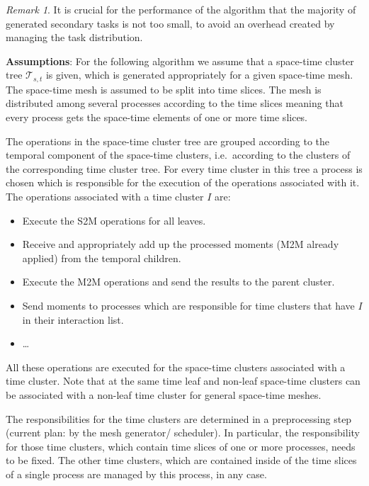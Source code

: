\documentclass[a4paper,11pt]{article}
\theoremstyle{plain}
\theoremstyle{definition}
\theoremstyle{remark}
\newtheorem{remark}[thm]{Remark}
\begin{document}
\begin{remark}
  It is crucial for the performance of the algorithm that the majority of generated secondary tasks is not too small, 
  to avoid an overhead created by managing the task distribution. 
\end{remark}

\textbf{Assumptions}: For the following algorithm we assume that a space-time cluster tree $\mathcal{T}_{s,t}$ is 
given, which is generated appropriately for a given space-time mesh. The space-time mesh is assumed to be split into 
time slices. The mesh is distributed among several processes according to the time slices meaning that every process 
gets the space-time elements of one or more time slices. 

The operations in the space-time cluster tree are grouped according to the temporal component of the space-time
clusters, i.e.~according to the clusters of the corresponding time cluster tree. For every time cluster in this tree a
process is chosen which is responsible for the execution of the operations associated with it. The operations associated
with a time cluster $I$ are:
\begin{itemize}
  \item Execute the S2M operations for all leaves.
  \item Receive and appropriately add up the processed moments (M2M already applied) from the temporal children.
  \item Execute the M2M operations and send the results to the parent cluster.
  \item Send moments to processes which are responsible for time clusters that have $I$ in their interaction list.
  \item \ldots
\end{itemize}
All these operations are executed for the space-time clusters associated with a time cluster. Note that at the same
time leaf and non-leaf space-time clusters can be associated with a non-leaf time cluster for general space-time 
meshes.

The responsibilities for the time clusters are determined in a preprocessing step (current plan: by the mesh 
generator/ scheduler). In particular, the responsibility for those time clusters, which contain time slices of one 
or more processes, needs to be fixed. The other time clusters, which are contained inside of the time slices
of a single process are managed by this process, in any case. 
\end{document}
